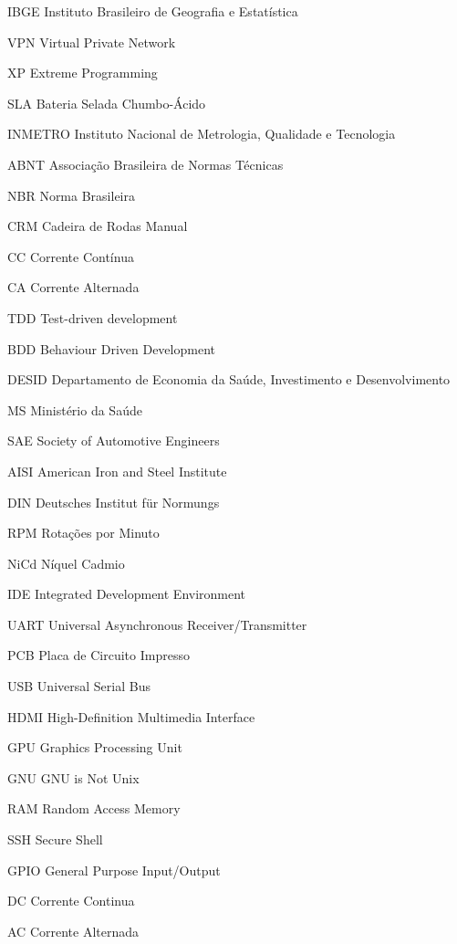 \begin{siglas}
  \item[IBGE] Instituto Brasileiro de Geografia e Estatística
  \item[VPN] Virtual Private Network
  \item [XP] Extreme Programming
  \item [SLA] Bateria Selada Chumbo-Ácido
  \item [INMETRO] Instituto Nacional de Metrologia, Qualidade e Tecnologia
  \item [ABNT] Associação Brasileira de Normas Técnicas
  \item [NBR] Norma Brasileira
  \item [CRM] Cadeira de Rodas Manual
  \item [CC] Corrente Contínua
  \item [CA] Corrente Alternada
  \item [TDD] Test-driven development
  \item [BDD] Behaviour Driven Development
  \item [DESID] Departamento de Economia da Saúde, Investimento e Desenvolvimento
  \item [MS] Ministério da Saúde
  \item [SAE] Society of Automotive Engineers
  \item [AISI] American Iron and Steel Institute
  \item [DIN] Deutsches Institut für Normungs
  \item [RPM] Rotações por Minuto
  \item [NiCd] Níquel Cadmio
  \item [IDE] Integrated Development Environment
  \item [UART] Universal Asynchronous Receiver/Transmitter
  \item [PCB] Placa de Circuito Impresso
  \item [USB] Universal Serial Bus
  \item [HDMI] High-Definition Multimedia Interface
  \item [GPU] Graphics Processing Unit
  \item [GNU] GNU is Not Unix
  \item [RAM] Random Access Memory
  \item [SSH] Secure Shell
  \item [GPIO] General Purpose Input/Output
  \item [DC] Corrente Continua
  \item [AC] Corrente Alternada

\end{siglas}
